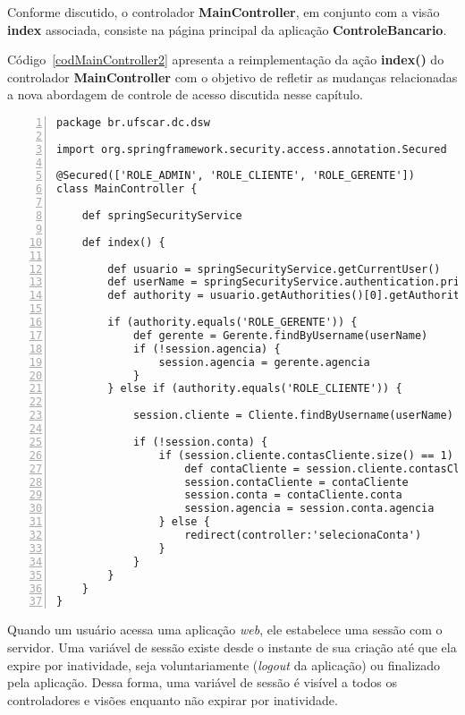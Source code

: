 \vspace{0.5cm}

Conforme discutido, o controlador {\bf  MainController}, em conjunto com a visão
{\bf  index}   associada,  consiste  na  página  principal   da  aplicação  {\bf
  ControleBancario}. 

\vspace{0.2cm}

Código~\ref{codMainController2}  apresenta   a  reimplementação  da   ação  {\bf
  index()} do  controlador {\bf  MainController} com o  objetivo de  refletir as
mudanças relacionadas  a nova  abordagem de controle  de acesso  discutida nesse
capítulo. 

\begin{lstlisting}[caption=Controlador    {\bf    MainController},   frame=trBL,
    float=htbp, label=codMainController2, numbers=left] 
package br.ufscar.dc.dsw

import org.springframework.security.access.annotation.Secured

@Secured(['ROLE_ADMIN', 'ROLE_CLIENTE', 'ROLE_GERENTE'])
class MainController {

    def springSecurityService

    def index() {

        def usuario = springSecurityService.getCurrentUser()
        def userName = springSecurityService.authentication.principal.getUsername()
        def authority = usuario.getAuthorities()[0].getAuthority()
        
        if (authority.equals('ROLE_GERENTE')) {
            def gerente = Gerente.findByUsername(userName)
            if (!session.agencia) {
                session.agencia = gerente.agencia
            }
        } else if (authority.equals('ROLE_CLIENTE')) {

            session.cliente = Cliente.findByUsername(userName)

            if (!session.conta) {
                if (session.cliente.contasCliente.size() == 1) {
                    def contaCliente = session.cliente.contasCliente[0]
                    session.contaCliente = contaCliente
                    session.conta = contaCliente.conta
                    session.agencia = session.conta.agencia
                } else {
                    redirect(controller:'selecionaConta')
                }
            }
        }        
    }
}
\end{lstlisting}

Quando um usuário acessa uma aplicação  {\it web}, ele estabelece uma sessão com
o servidor.  Uma variável de sessão existe  desde o instante de  sua criação até
que ela expire por inatividade, seja voluntariamente ({\it logout} da aplicação)
ou finalizado pela  aplicação.  Dessa forma, uma variável de  sessão é visível a
todos os controladores e visões enquanto não expirar por inatividade. 

